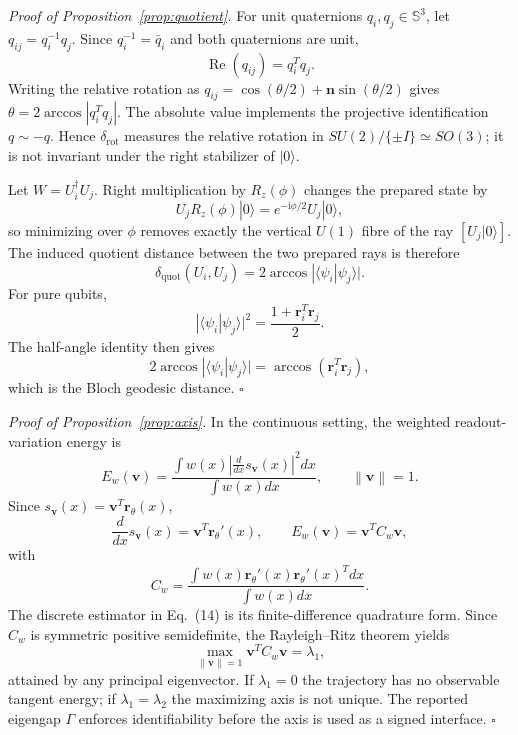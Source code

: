 \documentclass[a4paper,twocolumn,11pt,unpublished]{quantumarticle}
\newcommand{\ii}{\mathrm{i}}
\newcommand{\ket}[1]{|#1\rangle}
\newcommand{\Sph}{\mathbb{S}}
\newcommand{\bloch}{\boldsymbol{r}}
\newcommand{\axis}{\boldsymbol{v}}
\newcommand{\norm}[1]{\left\lVert #1\right\rVert}
\begin{document}
\textit{Proof of Proposition~\ref{prop:quotient}.}
For unit quaternions $q_i,q_j\in\Sph^3$, let $q_{ij}=q_i^{-1}q_j$. Since $q_i^{-1}=\bar q_i$ and both quaternions are unit,
\begin{equation}
\operatorname{Re}(q_{ij})=q_i^Tq_j.
\end{equation}
Writing the relative rotation as $q_{ij}=\cos(\theta/2)+\boldsymbol n\sin(\theta/2)$ gives $\theta=2\arccos|q_i^Tq_j|$. The absolute value implements the projective identification $q\sim-q$. Hence $\delta_{\mathrm{rot}}$ measures the relative rotation in $SU(2)/\{\pm I\}\simeq SO(3)$; it is not invariant under the right stabilizer of $\ket{0}$.

Let $W=U_i^{\dagger}U_j$. Right multiplication by $R_z(\phi)$ changes the prepared state by
\begin{equation}
U_jR_z(\phi)\ket{0}=e^{-\ii\phi/2}U_j\ket{0},
\end{equation}
so minimizing over $\phi$ removes exactly the vertical $U(1)$ fibre of the ray $[U_j\ket{0}]$. The induced quotient distance between the two prepared rays is therefore
\begin{equation}
\delta_{\mathrm{quot}}(U_i,U_j)=2\arccos|\langle\psi_i|\psi_j\rangle|.
\end{equation}
For pure qubits,
\begin{equation}
|\langle\psi_i|\psi_j\rangle|^2=\frac{1+\bloch_i^T\bloch_j}{2}.
\end{equation}
The half-angle identity then gives
\begin{equation}
2\arccos|\langle\psi_i|\psi_j\rangle|=\arccos(\bloch_i^T\bloch_j),
\end{equation}
which is the Bloch geodesic distance. \hfill$\square$

\textit{Proof of Proposition~\ref{prop:axis}.}
In the continuous setting, the weighted readout-variation energy is
\begin{equation}
E_w(\axis)=\frac{\int w(x)\left|\frac{d}{dx}s_{\axis}(x)\right|^2dx}{\int w(x)dx},\qquad \norm{\axis}=1.
\end{equation}
Since $s_{\axis}(x)=\axis^T\bloch_\theta(x)$,
\begin{equation}
\frac{d}{dx}s_{\axis}(x)=\axis^T\bloch_\theta'(x),\qquad
E_w(\axis)=\axis^TC_w\axis,
\end{equation}
with
\begin{equation}
C_w=\frac{\int w(x)\bloch_\theta'(x)\bloch_\theta'(x)^Tdx}{\int w(x)dx}.
\end{equation}
The discrete estimator in Eq.~(14) is its finite-difference quadrature form. Since $C_w$ is symmetric positive semidefinite, the Rayleigh--Ritz theorem yields
\begin{equation}
\max_{\norm{\axis}=1}\axis^TC_w\axis=\lambda_1,
\end{equation}
attained by any principal eigenvector. If $\lambda_1=0$ the trajectory has no observable tangent energy; if $\lambda_1=\lambda_2$ the maximizing axis is not unique. The reported eigengap $\Gamma$ enforces identifiability before the axis is used as a signed interface. \hfill$\square$
\end{document}
